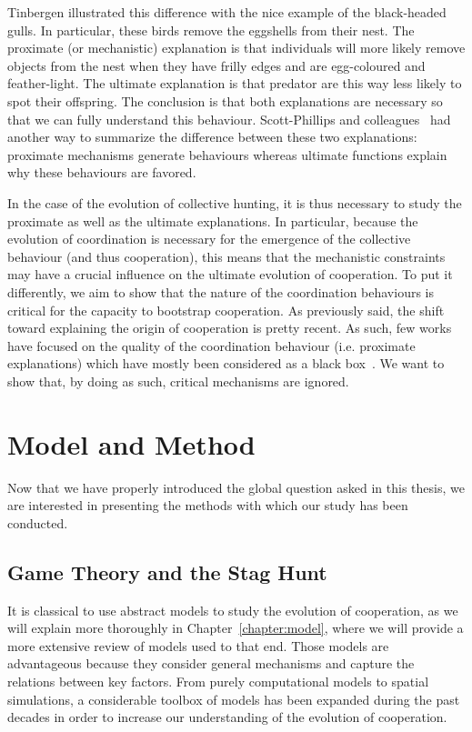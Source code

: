    Tinbergen illustrated this difference with the nice example of the black-headed gulls. In particular, these birds remove the eggshells from their nest. The proximate (or mechanistic) explanation is that individuals will more likely remove objects from the nest when they have frilly edges and are egg-coloured and feather-light. The ultimate explanation is that predator are this way less likely to spot their offspring. The conclusion is that both explanations are necessary so that we can fully understand this behaviour. Scott-Phillips and colleagues~\parencite{Scott-Phillips2011} had another way to summarize the difference between these two explanations: proximate mechanisms generate behaviours whereas ultimate functions explain why these behaviours are favored.

    In the case of the evolution of collective hunting, it is thus necessary to study the proximate as well as the ultimate explanations. In particular, because the evolution of coordination is necessary for the emergence of the collective behaviour (and thus cooperation), this means that the mechanistic constraints may have a crucial influence on the ultimate evolution of cooperation. To put it differently, we aim to show that the nature of the coordination behaviours is critical for the capacity to bootstrap cooperation. As previously said, the shift toward explaining the origin of cooperation is pretty recent. As such, few works have focused on the quality of the coordination behaviour (i.e. proximate explanations) which have mostly been considered as a black box~\parencite{Calcott2007a}. We want to show that, by doing as such, critical mechanisms are ignored.




\section{Model and Method}

  Now that we have properly introduced the global question asked in this thesis, we are interested in presenting the methods with which our study has been conducted.
  
  \subsection{Game Theory and the Stag Hunt}

    It is classical to use abstract models to study the evolution of cooperation, as we will explain more thoroughly in Chapter~\ref{chapter:model}, where we will provide a more extensive review of models used to that end. Those models are advantageous because they consider general mechanisms and capture the relations between key factors. From purely computational models to spatial simulations, a considerable toolbox of models has been expanded during the past decades in order to increase our understanding of the evolution of cooperation.

